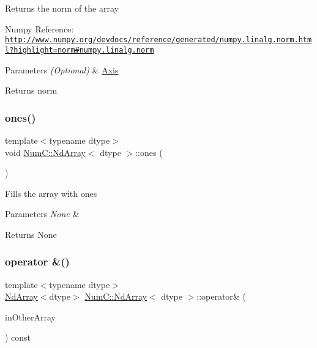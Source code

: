 Returns the norm of the array

Numpy Reference\+: \href{http://www.numpy.org/devdocs/reference/generated/numpy.linalg.norm.html?highlight=norm#numpy.linalg.norm}{\tt http\+://www.\+numpy.\+org/devdocs/reference/generated/numpy.\+linalg.\+norm.\+html?highlight=norm\#numpy.\+linalg.\+norm}


\begin{DoxyParams}{Parameters}
{\em (\+Optional)} & \mbox{\hyperlink{struct_num_c_1_1_axis}{Axis}} \\
\hline
\end{DoxyParams}
\begin{DoxyReturn}{Returns}
norm 
\end{DoxyReturn}
\mbox{\label{class_num_c_1_1_nd_array_aad4dd497617c112f0651c063101abf3f}} 
\subsubsection{\texorpdfstring{ones()}{ones()}}
{\footnotesize\ttfamily template$<$typename dtype$>$ \\
void \mbox{\hyperlink{class_num_c_1_1_nd_array}{Num\+C\+::\+Nd\+Array}}$<$ dtype $>$\+::ones (\begin{DoxyParamCaption}{ }\end{DoxyParamCaption})\hspace{0.3cm}{\ttfamily [inline]}}

Fills the array with ones


\begin{DoxyParams}{Parameters}
{\em None} & \\
\hline
\end{DoxyParams}
\begin{DoxyReturn}{Returns}
None 
\end{DoxyReturn}
\mbox{\label{class_num_c_1_1_nd_array_a1e12ef0c840772a2d180cdf679b81297}} 
\subsubsection{\texorpdfstring{operator \&()}{operator \&()}\hspace{0.1cm}{\footnotesize\ttfamily [1/2]}}
{\footnotesize\ttfamily template$<$typename dtype$>$ \\
\mbox{\hyperlink{class_num_c_1_1_nd_array}{Nd\+Array}}$<$dtype$>$ \mbox{\hyperlink{class_num_c_1_1_nd_array}{Num\+C\+::\+Nd\+Array}}$<$ dtype $>$\+::operator\& (\begin{DoxyParamCaption}\item[{const \mbox{\hyperlink{class_num_c_1_1_nd_array}{Nd\+Array}}$<$ dtype $>$ \&}]{in\+Other\+Array }\end{DoxyParamCaption}) const\hspace{0.3cm}{\ttfamily [inline]}}


